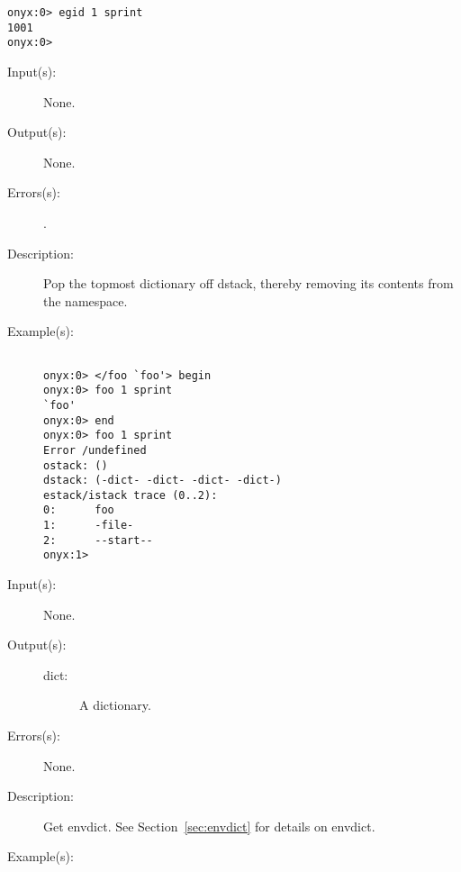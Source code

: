 \begin{description}
\begin{description}
\begin{verbatim}
onyx:0> egid 1 sprint
1001
onyx:0>
		\end{verbatim}
	\end{description}
\label{systemdict:end}
\item[{\onyxop{--}{end}{--}}: ]
	\begin{description}\item[]
	\item[Input(s): ] None.
	\item[Output(s): ] None.
	\item[Errors(s): ]
		\begin{description}\item[]
		\item[.]
		\end{description}
	\item[Description: ]
		Pop the topmost dictionary off dstack, thereby removing its
		contents from the namespace.
	\item[Example(s): ]\begin{verbatim}

onyx:0> </foo `foo'> begin
onyx:0> foo 1 sprint
`foo'
onyx:0> end
onyx:0> foo 1 sprint
Error /undefined
ostack: ()
dstack: (-dict- -dict- -dict- -dict-)
estack/istack trace (0..2):
0:      foo
1:      -file-
2:      --start--
onyx:1>
		\end{verbatim}
	\end{description}
\label{systemdict:envdict}
\item[{\onyxop{--}{envdict}{dict}}: ]
	\begin{description}\item[]
	\item[Input(s): ] None.
	\item[Output(s): ]
		\begin{description}\item[]
		\item[dict: ]
			A dictionary.
		\end{description}
	\item[Errors(s): ] None.
	\item[Description: ]
		Get envdict.  See Section~\ref{sec:envdict} for details on
		envdict.
	\item[Example(s): ]\begin{verbatim}


\end{verbatim}
\end{description}
\end{description}
